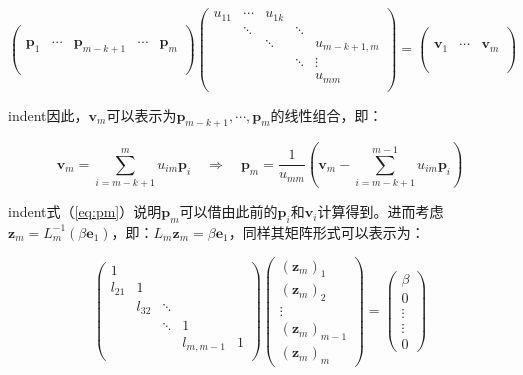 \documentclass[UTF8,nofonts]{ctexart}
\begin{document}
\[
\begin{pmatrix}
~ & ~ & ~ & ~ & \\
~ & ~ & ~ & ~ & \\
\boldsymbol{p}_1 & \cdots & \boldsymbol{p}_{m-k+1} & \cdots & \boldsymbol{p}_m \\
~ & ~ & ~ & ~ & \\
~ & ~ & ~ & ~ & \\
\end{pmatrix}
\begin{pmatrix}
u_{11} & \cdots & u_{1k} &  & \\
~ & \ddots & & \ddots & \\
& & \ddots & & u_{m-k+1,m} \\
& & & \ddots & \vdots \\
& & & & u_{mm} \\
\end{pmatrix}=
\begin{pmatrix}
~ & ~ & ~ \\
~ & ~ & ~ \\
\boldsymbol{v}_1 & \cdots & \boldsymbol{v}_m \\
~ & ~ & ~ \\
~ & ~ & ~ \\
\end{pmatrix}
\]

indent因此，$\boldsymbol{v}_m$可以表示为$\boldsymbol{p}_{m-k+1},\cdots,\boldsymbol{p}_m$的线性组合，即：

\begin{equation}
\label{eq:pm}
\boldsymbol{v}_m=\sum_{i=m-k+1}^{m}u_{im}\boldsymbol{p}_i\quad\Longrightarrow\quad
\boldsymbol{p}_m=\dfrac{1}{u_{mm}}\left(\boldsymbol{v}_m-\sum_{i=m-k+1}^{m-1}u_{im}\boldsymbol{p}_i\right)
\end{equation}

indent式（\ref{eq:pm}）说明$\boldsymbol{p}_m$可以借由此前的$\boldsymbol{p}_i$和$\boldsymbol{v}_i$计算得到。进而考虑$\boldsymbol{z}_m=L_m^{-1}(\beta\boldsymbol{e}_1)$，即：$L_m\boldsymbol{z}_m=\beta\boldsymbol{e}_1$，同样其矩阵形式可以表示为：

\[
\begin{pmatrix}
1 & & & & \\
l_{21} & 1 & & & \\
& l_{32} & \ddots & & \\
& & \ddots & 1 & \\
& & & l_{m,m-1} & 1 \\
\end{pmatrix}
\begin{pmatrix}
(\boldsymbol{z}_m)_1 \\ (\boldsymbol{z}_m)_2 \\ \vdots \\ (\boldsymbol{z}_m)_{m-1} \\ (\boldsymbol{z}_m)_m
\end{pmatrix}=
\begin{pmatrix}
\beta \\ 0 \\ \vdots \\ \vdots \\ 0
\end{pmatrix}
\]
\end{document}
